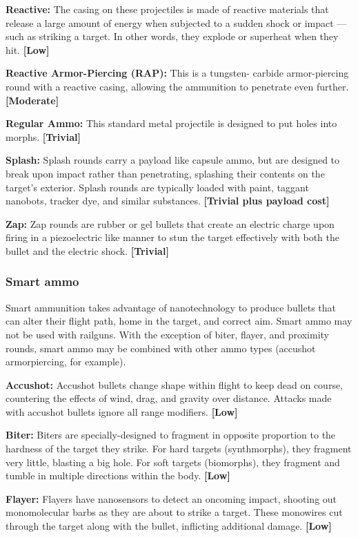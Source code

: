\textbf{Reactive:} The casing on these projectiles is made of reactive materials that release a large amount of energy when subjected to a sudden shock or impact --- such as striking a target. In other words, they explode or superheat when they hit. \textbf{[Low]} 

\textbf{Reactive Armor-Piercing (RAP):} This is a tungsten- carbide armor-piercing round with a reactive casing, allowing the ammunition to penetrate even further. \textbf{[Moderate]} 

\textbf{Regular Ammo:} This standard metal projectile is designed to put holes into morphs. \textbf{[Trivial]} 

\textbf{Splash:} Splash rounds carry a payload like capsule ammo, but are designed to break upon impact rather than penetrating, splashing their contents on the target’s exterior. Splash rounds are typically loaded with paint, taggant nanobots, tracker dye, and similar substances. \textbf{[Trivial plus payload cost]} 

\textbf{Zap:} Zap rounds are rubber or gel bullets that create an electric charge upon firing in a piezoelectric like manner to stun the target effectively with both the bullet and the electric shock. \textbf{[Trivial]} 

\subsubsection{Smart ammo} 

Smart ammunition takes advantage of nanotechnology to produce bullets that can alter their flight path, home in the target, and correct aim. Smart ammo may not be used with railguns. With the exception of biter, flayer, and proximity rounds, smart ammo may be combined with other ammo types (accushot armorpiercing, for example). 

\textbf{Accushot:} Accushot bullets change shape within flight to keep dead on course, countering the effects of wind, drag, and gravity over distance. Attacks made with accushot bullets ignore all range modifiers. \textbf{[Low]} 

\textbf{Biter:} Biters are specially-designed to fragment in opposite proportion to the hardness of the target they strike. For hard targets (synthmorphs), they fragment very little, blasting a big hole. For soft targets (biomorphs), they fragment and tumble in multiple directions within the body. \textbf{[Low]} 

\textbf{Flayer:} Flayers have nanosensors to detect an oncoming impact, shooting out monomolecular barbs as they are about to strike a target. These monowires cut through the target along with the bullet, inflicting additional damage. \textbf{[Low]} 

